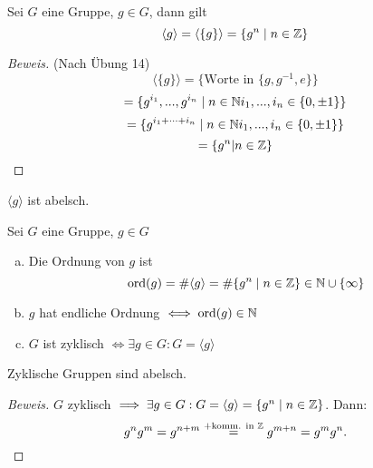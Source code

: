\documentclass[a4paper]{report}
\begin{document}
\begin{lemm}
Sei $G$ eine Gruppe, $g \in G$, dann gilt
$$\langle g \rangle = \langle \{g\} \rangle = \{g^{n} \mid n \in \Bbb Z\}$$
\begin{proof}[Beweis]
(Nach Übung 14) $$\langle \{g\} \rangle = \{\text{Worte in } \{g, g^{-1}, e\}\}$$
$$ = \{g^{i_{1}}, ..., g^{i_{n}} \mid n \in \Bbb N i_{1}, ..., i_{n} \in \{0, \pm 1\}\}$$
$$= \{g^{i_{1}+\cdots + i_{n}} \mid n \in \Bbb N i_{1}, ..., i_{n} \in \{0, \pm 1\}\}$$
$$= \{g^{n} | n \in \Bbb Z\}$$
\end{proof}
\end{lemm}
\begin{bem*}$\langle g \rangle$ ist abelsch.\end{bem*}
\begin{defi}
  Sei $G$ eine Gruppe, $g \in G$

\begin{enumerate}[(a)]

 \item Die Ordnung von $g$ ist
$$\mathrm{ord}(g) = \# \langle g \rangle = \# \{ g^{n} \mid n \in \Bbb{Z} \} \in \Bbb{N} \cup \{\infty\}$$
 \item$g$ hat endliche Ordnung $\iff \mathrm{ord}(g) \in \Bbb N$
 \item $G$ ist zyklisch $\iff \exists g \in G : G = \langle g \rangle$
\end{enumerate}
\end{defi}


\begin{prop}
  Zyklische Gruppen sind abelsch.
  \begin{proof}[Beweis]
$G$ zyklisch $\implies \exists g \in G : G = \langle g \rangle = \{ g^{n} \mid n \in \Bbb{Z} \}$. Dann: $$g^{n}g^{m} = g^{n+m} \overset{+ \text{komm. in } \Bbb Z}= g^{m+n} = g^{m}g^{n}.$$
  \end{proof}
\end{prop}
\end{document}
